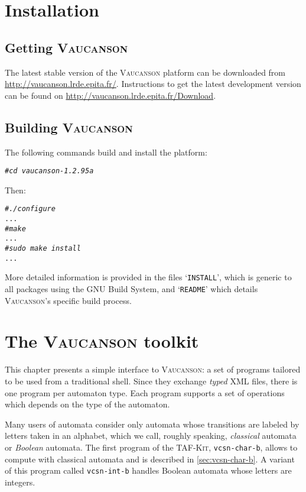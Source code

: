 \documentclass[a4paper]{report}
\newenvironment{shell}
{\begin{alltt}}
{\end{alltt}}
\def\VcsnVersion{1.2.95a}
\newcommand\kbd[1]{\textsl{\texttt{#1}}}
\newcommand\file[1]{`\texttt{#1}'}
\newcommand\command[1]{\texttt{#1}}
\newcommand{\tafkit}{\textsc{TAF-Kit}\xspace}
\newcommand{\Vauc}{\textsc{Vaucanson}\xspace}
\begin{document}
\chapter{Installation}

\section{Getting \Vauc}

The latest stable version of the \Vauc platform can be downloaded
from \url{http://vaucanson.lrde.epita.fr/}.  Instructions to get
the latest development version can be found on
\url{http://vaucanson.lrde.epita.fr/Download}.

\section{Building \Vauc}

The following commands build and install the platform:
\begin{shell}
# \kbd{cd vaucanson-\VcsnVersion}
\end{shell}
Then:
\begin{shell}
# \kbd{./configure}
...
# \kbd{make}
...
# \kbd{sudo make install}
...
\end{shell}

More detailed information is provided in the files \file{INSTALL},
which is generic to all packages using the GNU Build System, and
\file{README} which details \Vauc's specific build process.

\chapter{The \Vauc toolkit}
\label{sec:tafkit}

This chapter presents a simple interface to \Vauc: a set of programs
tailored to be used from a traditional shell.  Since they exchange
\emph{typed} XML files, there is one program per automaton type.  Each
program supports a set of operations which depends on the type of the
automaton.

Many users of automata consider only automata whose transitions are
labeled by letters taken in an alphabet, which we call, roughly
speaking, \emph{classical} automata or \emph{Boolean} automata.  The
first program of the \tafkit, \command{vcsn-char-b}, allows to compute
with classical automata and is described in \autoref{sec:vcsn-char-b}.
A variant of this program called \command{vcsn-int-b} handles Boolean
automata whose letters are integers.
\end{document}
